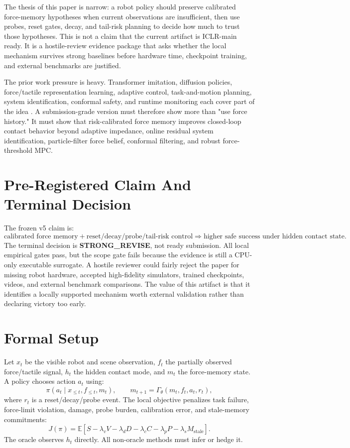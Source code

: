 \documentclass{article}
\begin{document}
The thesis of this paper is narrow: a robot policy should preserve calibrated force-memory hypotheses when current observations are insufficient, then use probes, reset gates, decay, and tail-risk planning to decide how much to trust those hypotheses. This is not a claim that the current artifact is ICLR-main ready. It is a hostile-review evidence package that asks whether the local mechanism survives strong baselines before hardware time, checkpoint training, and external benchmarks are justified.

The prior work pressure is heavy. Transformer imitation, diffusion policies, force/tactile representation learning, adaptive control, task-and-motion planning, system identification, conformal safety, and runtime monitoring each cover part of the idea \citep{zhong2023accurate11,hollingworth2006scene12,hollingworth2005the13,zhou2024care14,khan2026zerorel15,yang2023neural16,wu2022masked17,yan2026meap18}. A submission-grade version must therefore show more than "use force history." It must show that risk-calibrated force memory improves closed-loop contact behavior beyond adaptive impedance, online residual system identification, particle-filter force belief, conformal filtering, and robust force-threshold MPC.

\section{Pre-Registered Claim And Terminal Decision}
The frozen v5 claim is:
\[
  \text{calibrated force memory} + \text{reset/decay/probe/tail-risk control}
  \Rightarrow \text{higher safe success under hidden contact state}.
\]
The terminal decision is \textbf{STRONG\_REVISE}, not ready submission. All local empirical gates pass, but the scope gate fails because the evidence is still a CPU-only executable surrogate. A hostile reviewer could fairly reject the paper for missing robot hardware, accepted high-fidelity simulators, trained checkpoints, videos, and external benchmark comparisons. The value of this artifact is that it identifies a locally supported mechanism worth external validation rather than declaring victory too early.

\section{Formal Setup}
Let $x_t$ be the visible robot and scene observation, $f_t$ the partially observed force/tactile signal, $h_t$ the hidden contact mode, and $m_t$ the force-memory state. A policy chooses action $a_t$ using:
\[
  \pi(a_t \mid x_{\leq t}, f_{\leq t}, m_t), \qquad
  m_{t+1} = \Gamma_\theta(m_t, f_t, a_t, r_t),
\]
where $r_t$ is a reset/decay/probe event. The local objective penalizes task failure, force-limit violation, damage, probe burden, calibration error, and stale-memory commitments:
\[
J(\pi)=\mathbb{E}\left[
S - \lambda_v V - \lambda_d D - \lambda_c C - \lambda_p P - \lambda_s M_{\mathrm{stale}}
\right].
\]
The oracle observes $h_t$ directly. All non-oracle methods must infer or hedge it.
\end{document}
